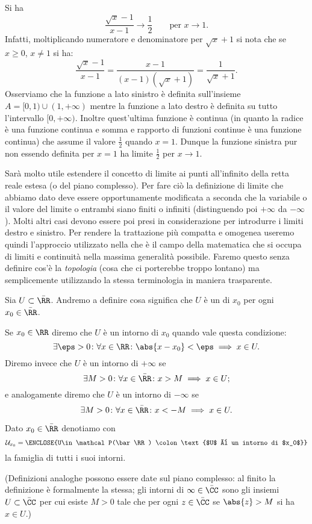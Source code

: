 \begin{example}
  Si ha 
  \[
  \frac{\sqrt{x}-1}{x-1} \to \frac 1 2 \qquad \text{per $x\to 1$}. 
  \]
  Infatti, moltiplicando numeratore e denominatore 
  per $\sqrt x + 1$ si nota che se $x\ge 0$, $x\neq 1$ si ha:
  \[
      \frac{\sqrt x-1}{x-1}
      = \frac{x-1}{(x-1)(\sqrt x +1)}
      = \frac{1}{\sqrt x + 1}.
  \]
  Osserviamo che la funzione a lato sinistro è definita sull'insieme 
  $A = [0,1)\cup(1,+\infty)$ mentre la funzione a lato
  destro è definita su tutto l'intervallo $[0,+\infty)$.
  Inoltre quest'ultima funzione è continua 
  (in quanto la radice è una funzione continua e somma e rapporto di funzioni 
  continue è una funzione continua) che assume il valore $\frac 1 2$
  quando $x=1$. 
  Dunque la funzione sinistra pur non essendo definita per $x=1$ 
  ha limite $\frac 1 2$ per $x\to 1$.
\end{example}

Sarà molto utile estendere il concetto di limite 
ai punti all'infinito della retta reale estesa (o del piano complesso).
Per fare ciò la definizione di limite che abbiamo dato deve 
essere opportunamente modificata a seconda che la variabile o il valore 
del limite o entrambi siano finiti o infiniti (distinguendo poi $+\infty$ 
da $-\infty$). 
Molti altri casi devono essere poi presi in considerazione 
per introdurre i limiti destro e sinistro.
Per rendere la trattazione più compatta e omogenea useremo 
quindi l'approccio utilizzato nella  che è 
il campo della matematica che si occupa di limiti e continuità nella 
massima generalità possibile. 
Faremo questo senza definire cos'è la \emph{topologia} 
(cosa che ci porterebbe troppo lontano) ma semplicemente 
utilizzando la stessa terminologia in maniera trasparente.

\begin{definition}[intorno]
Sia $U\subset\bar \RR$. Andremo a definire cosa 
significa che $U$ è un  di $x_0$
per ogni $x_0\in \bar \RR$.

Se $x_0\in \RR$ diremo che $U$ è un intorno di $x_0$ 
quando vale questa condizione:
\[
\exists \eps>0 \colon \forall x\in \RR\colon 
\abs{x-x_0} < \eps \implies x\in U.
\]
Diremo invece che $U$ è un intorno di $+\infty$ 
se 
\[
 \exists M>0 \colon \forall x\in \bar \RR \colon 
 x > M \implies x\in U;
\]
e analogamente diremo che $U$ è un intorno di $-\infty$
se 
\[
 \exists M>0 \colon \forall x\in \bar \RR\colon 
 x < -M \implies x \in U.  
\]

Dato $x_0\in \bar \RR$ denotiamo con
\[
  \mathcal U_{x_0} = \ENCLOSE{U\in \mathcal P(\bar \RR)
  \colon \text{$U$ è un intorno di $x_0$}}
\]
la famiglia di tutti i suoi intorni.

(Definizioni analoghe possono essere date sul piano complesso: al finito 
la definizione è formalmente la stessa; gli intorni di $\infty\in \bar \CC$ 
sono gli insiemi $U\subset \bar \CC$ per cui esiste $M>0$ tale che per ogni $z\in \bar \CC$ 
se $\abs{z}>M$ si ha $x\in U$.)
\end{definition}


